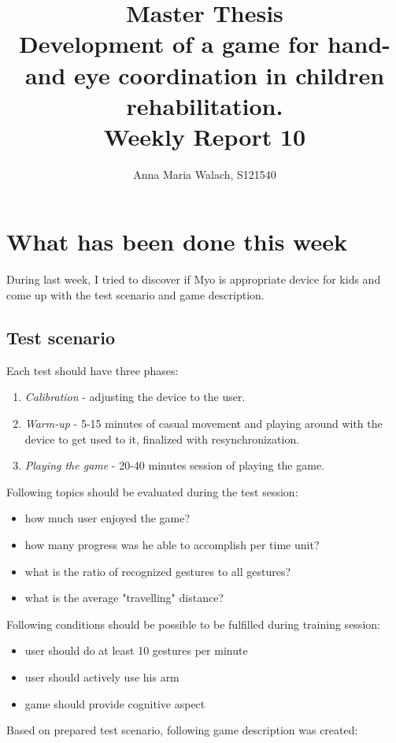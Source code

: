 \documentclass[10pt,a4paper]{article}
\title{{Master Thesis\\[0.5em]}
       {\bf \huge Development of a game for hand- and eye coordination in children rehabilitation.\\[0.5em]}
       {\bf Weekly Report 10}}
\author{Anna Maria Walach, S121540}
\begin{document}
\maketitle

\section*{What has been done this week}
During last week, I tried to discover if Myo is appropriate device for kids and come up with the test scenario and game description. 
\subsection*{Test scenario}
Each test should have three phases:
\begin{enumerate}
\item \emph{Calibration} - adjusting the device to the user.
\item \emph{Warm-up} - 5-15 minutes of casual movement and playing around with the device to get used to it, finalized with resynchronization. 
\item \emph{Playing the game} - 20-40 minutes session of playing the game.
\end{enumerate}

Following topics should be evaluated during the test session:
\begin{itemize}
\item how much user enjoyed the game?
\item how many progress was he able to accomplish per time unit?
\item what is the ratio of recognized gestures to all gestures?
\item what is the average "travelling" distance?
\end{itemize}

Following conditions should be possible to be fulfilled during training session:
\begin{itemize}
\item user should do at least 10 gestures per minute
\item user should actively use his arm
\item game should provide cognitive aspect
\end{itemize}

Based on prepared test scenario, following game description was created:
\end{document}
